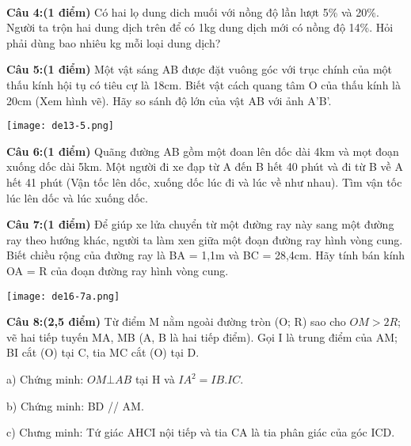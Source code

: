 \documentclass[12pt]{article}
\begin{document}
\    

\textbf{Câu 4:(1 điểm)} Có hai lọ dung dich muối với nồng độ lần lượt 5\% và 20\%. Người ta trộn hai dung dịch trên để có 1kg dung dịch mới có nồng độ 14\%. Hỏi phải dùng bao nhiêu kg mỗi loại dung dịch?

\begin{multicols}{2}

\textbf{Câu 5:(1 điểm)} Một vật sáng AB được đặt vuông góc với trục chính của một thấu kính hội tụ có tiêu cự là 18cm. Biết vật cách quang tâm O của thấu kính là 20cm (Xem hình vẽ). Hãy so sánh độ lớn của vật AB với ảnh A'B'.

\columnbreak

\begin{center}
    \texttt{[image: de13-5.png]}
\end{center}

\end{multicols}

\textbf{Câu 6:(1 điểm)} Quãng đường AB gồm một đoan lên dốc dài 4km và mọt đoạn xuống dốc dài 5km. Một người đi xe đạp từ A đến B hết 40 phút và đi từ B về A hết 41 phút (Vận tốc lên dốc, xuống dốc lúc đi và lúc về như nhau). Tìm vận tốc lúc lên dốc và lúc xuống dốc. 

\begin{multicols}{2}   

\textbf{Câu 7:(1 điểm)} Để giúp xe lửa chuyển từ một đường ray này sang một đường ray theo hướng khác, người ta làm xen giữa một đoạn đường ray hình vòng cung. Biết chiều rộng của đường ray là BA = 1,1m và BC = 28,4cm. Hãy tính bán kính OA = R của đoạn đường ray hình vòng cung. \par

\columnbreak

\begin{center}
    \texttt{[image: de16-7a.png]}
\end{center}

\end{multicols}

\textbf{Câu 8:(2,5 điểm)} Từ điểm M nằm ngoài đường tròn (O; R) sao cho $OM > 2R$; vẽ hai tiếp tuyến MA, MB (A, B là hai tiếp điểm). Gọi I là trung điểm của AM; BI cắt (O) tại C, tia MC cắt (O) tại D. \par
a) Chứng minh: $OM \bot AB$ tại H và $IA^2 = IB.IC$. \par
b) Chứng minh: BD // AM. \par
c) Chưng minh: Tứ giác AHCI nội tiếp và tia CA là tia phân giác của góc ICD. \par
\end{document}
